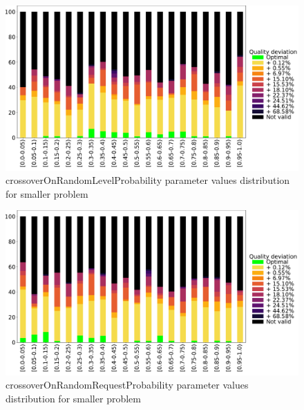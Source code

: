 \begin{figure}
	\centering
	\includegraphics[width=\textwidth]{images/DistrObj/crossoverOnRandomLevelProbability.pdf}
	\caption[crossoverOnRandomLevelProbability parameter values distribution for smaller problem]{crossoverOnRandomLevelProbability parameter values distribution for smaller problem}
	\label{fig:crossoverOnRandomLevelProbability_Obj}
\end{figure}

\begin{figure}
	\centering
	\includegraphics[width=\textwidth]{images/DistrObj/crossoverOnRandomRequestProbability.pdf}
	\caption[crossoverOnRandomRequestProbability parameter values distribution for smaller problem]{crossoverOnRandomRequestProbability parameter values distribution for smaller problem}       
	\label{fig:crossoverOnRandomRequestProbability_Obj}
\end{figure}


